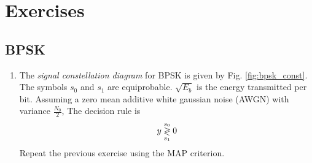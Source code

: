 \documentclass[10pt, a4paper]{article}
\begin{document}
\section{Exercises}
\subsection{BPSK}
\begin{enumerate}
\item 
The {\em signal constellation diagram} for BPSK is given by Fig. \ref{fig:bpsk_const}.  The symbols $s_0$ and $s_1$ are equiprobable.  $\sqrt{E_b}$ is the energy transmitted per bit. Assuming a zero mean additive white gaussian noise (AWGN) with variance $\frac{N_0}{2}$,
The decision rule is
\begin{equation}
y \overset{s_0}{\underset{s_1}{\gtrless}} 0
\end{equation}
Repeat the previous exercise using the MAP criterion.


\end{enumerate}
\end{document}
